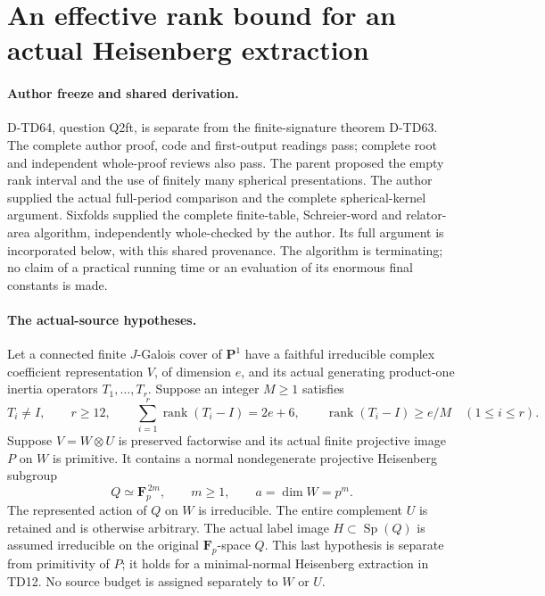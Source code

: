 \section{An effective rank bound for an actual Heisenberg extraction}
\label{sec:heisenberg-effective-rank}

\paragraph{Author freeze and shared derivation.}
D-TD64, question Q2ft, is separate from the finite-signature theorem
D-TD63.  The complete author proof, code and first-output readings
pass; complete root and independent whole-proof reviews also pass.
The parent proposed the empty rank interval and
the use of finitely many spherical presentations.  The author supplied
the actual full-period comparison and the complete spherical-kernel
argument.  Sixfolds supplied the complete finite-table, Schreier-word
and relator-area algorithm, independently whole-checked by the author.
Its full argument is incorporated below, with this shared provenance.
The algorithm is terminating; no claim of a practical running time or
an evaluation of its enormous final constants is made.

\paragraph{The actual-source hypotheses.}
Let a connected finite \(J\)-Galois cover of \(\mathbf P^1\) have a
faithful irreducible complex coefficient representation \(V\), of
dimension \(e\), and its actual generating product-one inertia
operators \(T_1,\ldots,T_r\).  Suppose an integer \(M\ge1\) satisfies
\[
 T_i\ne I,\qquad r\ge12,\qquad
 \sum_{i=1}^r\operatorname{rank}(T_i-I)=2e+6,\qquad
 \operatorname{rank}(T_i-I)\ge e/M\quad(1\le i\le r).
 \tag{HER.1}
\]
Suppose \(V=W\otimes U\) is preserved factorwise and its actual finite
projective image \(P\) on \(W\) is primitive.  It contains a normal
nondegenerate projective Heisenberg subgroup
\[
 Q\simeq\mathbf F_p^{\,2m},\qquad m\ge1,\qquad
 a=\dim W=p^m.
 \tag{HER.2}
\]
The represented action of \(Q\) on \(W\) is irreducible.  The entire
complement \(U\) is retained and is otherwise arbitrary.
The actual label image \(H\subset\operatorname{Sp}(Q)\) is assumed
irreducible on the original \(\mathbf F_p\)-space \(Q\).
This last hypothesis is separate from primitivity of \(P\); it holds
for a minimal-normal Heisenberg extraction in TD12.
No source budget is assigned separately to \(W\) or \(U\).

